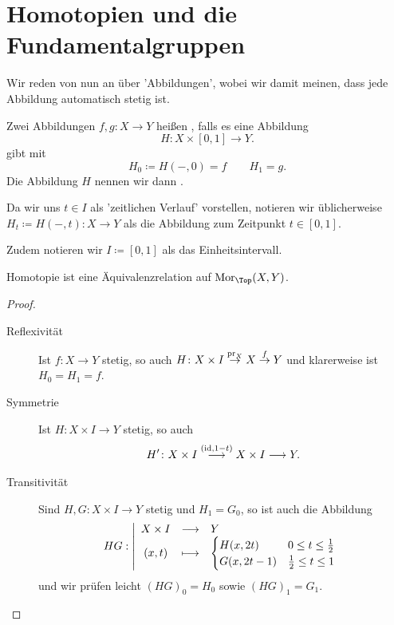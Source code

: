 \section{Homotopien und die Fundamentalgruppen}
\begin{oral}
    Wir reden von nun an über 'Abbildungen', wobei wir damit meinen, dass jede Abbildung automatisch stetig ist.
\end{oral}

\begin{definition}[Homotopie]\label{def:homotop}
    Zwei Abbildungen $f,g\colon  X \to  Y$ heißen , falls es eine Abbildung
    \[
        H \colon  X \times [0,1] \to  Y
    .\] 
    gibt mit 
    \[
        H_0 \coloneqq  H(-,0) = f \qquad H_1 = g
    .\] 
    Die Abbildung $H$ nennen wir dann  . 
\end{definition}

\begin{dnotation}
    Da wir uns $t\in I$ als 'zeitlichen Verlauf' vorstellen, notieren wir üblicherweise $H_t \coloneqq  H(-,t)\colon  X \to  Y$ als die Abbildung zum Zeitpunkt $t\in [0,1]$. 

    Zudem notieren wir $I \coloneqq  [0,1]$ als das Einheitsintervall.
\end{dnotation}

\begin{lemma}
    Homotopie ist eine Äquivalenzrelation auf $\Mor_{\Top}(X,Y)$.
\end{lemma}
\begin{proof}
    \begin{description}
        \item[Reflexivität] Ist $f\colon  X \to  Y$ stetig, so auch  $H \colon  X \times I \stackrel{\operatorname{pr}_X}{\to } X \stackrel{f}{\to } Y $ und klarerweise ist $H_0 = H_1 = f$.
        \item[Symmetrie] Ist $H \colon  X \times I \to  Y$ stetig, so auch
            \[
                H' \colon  X \times I \stackrel{(\mathrm{id}, 1-t)}{\longrightarrow}  X\times I \longrightarrow  Y
            .\] 
        \item[Transitivität] Sind $H,G \colon  X \times I \to  Y$ stetig und $H_1 = G_0$, so ist auch die Abbildung
                \begin{equation*}
                HG: \left| \begin{array}{c c l} 
                X\times I & \longrightarrow & Y \\
                (x,t) & \longmapsto &  \begin{cases}
                    H(x,2t) & 0 \leq  t \leq  \frac{1}{2} \\
                    G(x, 2t-1) & \frac{1}{2}\leq t\leq 1
                \end{cases}
                \end{array} \right.
            \end{equation*}
            und wir prüfen leicht $(HG)_0 = H_0$ sowie $(HG)_1 = G_1$.
    \end{description}
\end{proof}

